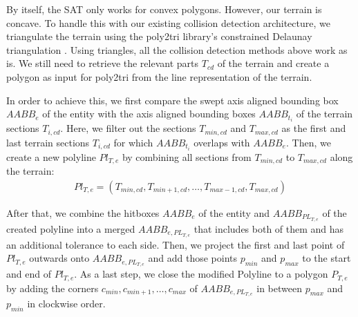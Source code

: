 By itself, the SAT only works for convex polygons.
However, our terrain is concave.
To handle this with our existing collision detection architecture, we triangulate the terrain using the poly2tri library's constrained Delaunay triangulation \cite{poly2tri}.
Using triangles, all the collision detection methods above work as is.
We still need to retrieve the relevant parts $T_{cd}$ of the terrain and create a polygon as input for poly2tri from the line representation of the terrain.

In order to achieve this, we first compare the swept axis aligned bounding box $AABB_e$ of the entity with the axis aligned bounding boxes $AABB_{t_{i}}$ of the terrain sections $T_{i, cd}$. 
Here, we filter out the sections $T_{min, cd}$ and $T_{max, cd}$ as the first and last terrain sections $T_{i, cd}$ for which $AABB_{t_{i}}$ overlaps with $AABB_e$.
Then, we create a new polyline $Pl_{T,e}$ by combining all sections from $T_{min, cd}$ to $T_{max, cd}$ along the terrain:
\begin{align}
  Pl_{T,e} = (T_{min, cd}, T_{min + 1, cd}, \dots, T_{max - 1, cd}, T_{max, cd})
\end{align}

After that, we combine the hitboxes $AABB_e$ of the entity and $AABB_{PL_{T,e}}$ of the created polyline into a merged $AABB_{e, PL_{T,e}}$ that includes both of them and has an additional tolerance to each side.
Then, we project the first and last point of $Pl_{T,e}$ outwards onto $AABB_{e, PL_{T,e}}$ and add those points $p_{min}$ and $p_{max}$ to the start and end of $Pl_{T,e}$.
As a last step, we close the modified Polyline to a polygon $P_{T,e}$ by adding the corners $c_{min}, c_{min+1}, \dots, c_{max}$ of $AABB_{e, PL_{T,e}}$ in between $p_{max}$ and $p_{min}$ in clockwise order.

\vspace{-\abovedisplayskip}

